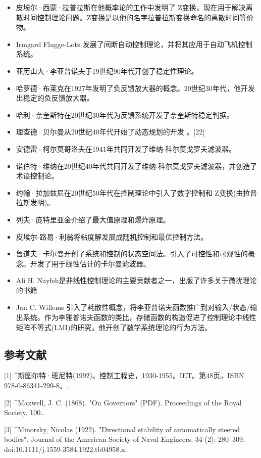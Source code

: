 \begin{itemize}
\item 皮埃尔·西蒙·拉普拉斯在他概率论的工作中发明了 Z变换，现在用于解决离散时间控制理论问题。Z变换是以他的名字拉普拉斯变换命名的离散时间等价物。
\item Irmgard Flugge-Lotz 发展了间断自动控制理论，并将其应用于自动飞机控制系统。
\item 亚历山大·李亚普诺夫于19世纪90年代开创了稳定性理论。
\item 哈罗德·布莱克在1927年发明了负反馈放大器的概念。20世纪30年代，他开发出稳定的负反馈放大器。
\item 哈利·奈奎斯特在20世纪30年代为反馈系统开发了奈奎斯特稳定判据。
\item 理查德·贝尔曼从20世纪40年代开始了动态规划的开发 。[22]
\item 安德雷·柯尔莫哥洛夫在1941年共同开发了维纳-科尔莫戈罗夫滤波器。
\item 诺伯特·维纳在20世纪40年代共同开发了维纳-科尔莫戈罗夫滤波器，并创造了术语控制论。
\item 约翰·拉加兹尼在20世纪50年代在控制理论中引入了数字控制和 Z变换(由拉普拉斯发明)。
\item 列夫·庞特里亚金介绍了最大值原理和爆炸原理。
\item 皮埃尔-路易·利翁将粘度解发展成随机控制和最优控制方法。
\item 鲁道夫·卡尔曼开创了系统和控制的状态空间法。引入了可控性和可观性的概念。开发了用于线性估计的卡尔曼滤波器。
\item Ali H. Nayfeh是非线性控制理论的主要贡献者之一，出版了许多关于微扰理论的书籍
\item Jan C. Willems 引入了耗散性概念，将李亚普诺夫函数推广到对输入/状态/输出系统。作为李雅普诺夫函数的类比，存储函数的构造促进了控制理论中线性矩阵不等式(LMI)的研究。他开创了数学系统理论的行为方法。
\end{itemize}


\subsection{参考文献}

[1]
^斯图尔特·班尼特(1992)。控制工程史，1930-1955。IET。第48页。ISBN 978-0-86341-299-8。.

[2]
^Maxwell, J. C. (1868). "On Governors" (PDF). Proceedings of the Royal Society. 100..

[3]
^Minorsky, Nicolas (1922). "Directional stability of automatically steered bodies". Journal of the American Society of Naval Engineers. 34 (2): 280–309. doi:10.1111/j.1559-3584.1922.tb04958.x..

